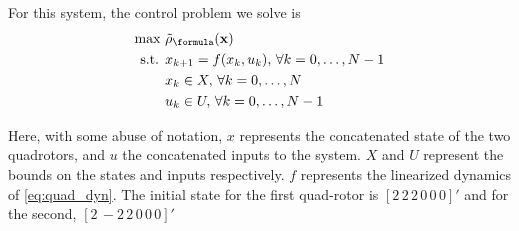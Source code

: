 For this system, the control problem we solve is
\begin{subequations}
\label{eq:atc_ctrl}
\begin{align}
\text{max } & \srob_{\formula}(\sstraj) \\ %
\text{s.t. } & x_{k+1} = f(x_k,u_k), \, \forall k=0,\dotsc,N-1 \\
 & x_k \in X, \, \forall k=0,\dotsc,N \\
 & u_k \in U, \, \forall k=0,\dotsc,N-1 
\end{align}
\end{subequations}

Here, with some abuse of notation, $x$ represents the concatenated state of the two quadrotors, and $u$ the concatenated inputs to the system. $X$ and $U$ represent the bounds on the states and inputs respectively. $f$ represents the linearized dynamics of \eqref{eq:quad_dyn}. The initial state for the first quad-rotor is $[2\,2\,2\,0\,0\,0]'$ and for the second, $[2 \, -2 \, 2 \,0 \,0 \,0]'$



